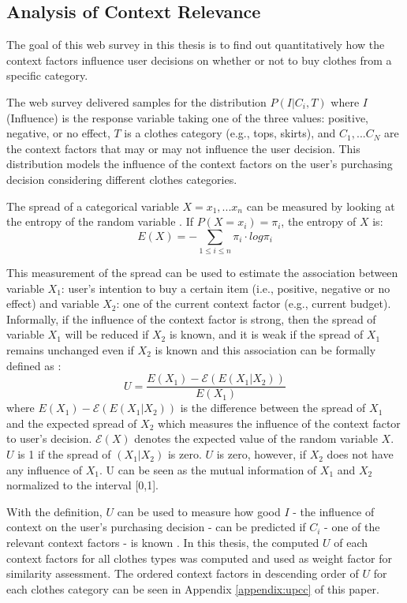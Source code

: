 \subsection{Analysis of Context Relevance} \label{sec:acr_acr}

The goal of this web survey in this thesis is to find out quantitatively how the context factors influence user decisions on whether or not to buy clothes from a specific category. 

The web survey delivered samples for the distribution $P(I|C_i,T)$ where $I$ (Influence) is the response variable taking one of the three values: positive, negative, or no effect, $T$ is a clothes category (e.g., tops, skirts), and $C_1, ... C_N$ are the context factors that may or may not influence the user decision. This distribution models the influence of the context factors on the user's purchasing decision considering different clothes categories. 

The spread of a categorical variable $X={x_1, ... x_n}$ can be measured by looking at the entropy of the random variable \cite{ref:45}. If $P(X=x_i)=\pi_i$, the entropy of $X$ is: 
$$E(X)=-\sum_{1\leq i\leq n}\pi_i \cdot log{\pi_i} $$

This measurement of the spread can be used to estimate the association between variable $X_1$:  user's intention to buy a certain item (i.e., positive, negative or no effect) and variable $X_2$: one of the current context factor (e.g., current budget). Informally, if the influence of the context factor is strong, then the spread of variable $X_1$ will be reduced if $X_2$ is known, and it is weak if the spread of $X_1$ remains unchanged even if $X_2$ is known and this association can be formally defined as \cite{ref:18}:
$$U=\frac{E(X_1)-\mathcal{E}(E(X_1|X_2))}{E(X_1)}$$
where $E(X_1)-\mathcal{E}(E(X_1|X_2))$ is the difference between the spread of $X_1$ and the expected spread of $X_2$ which measures the influence of the context factor to user's decision. $\mathcal{E}(X)$ denotes the expected value of the random variable $X$. $U$ is 1 if the spread of $(X_1|X_2)$ is zero. $U$ is zero, however, if $X_2$ does not have any influence of $X_1$. U can be seen as the mutual information of $X_1$ and $X_2$ normalized to the interval [0,1]. 

With the definition, $U$ can be used to measure how good $I$ - the influence of context on the user's purchasing decision - can be predicted if $C_i$ - one of the relevant context factors - is known \cite{ref:18}. In this thesis, the computed $U$ of each context factors for all clothes types was computed and used as weight factor for similarity assessment. The ordered context factors in descending order of $U$ for each clothes category can be seen in Appendix \ref{appendix:upcc} of this paper.

